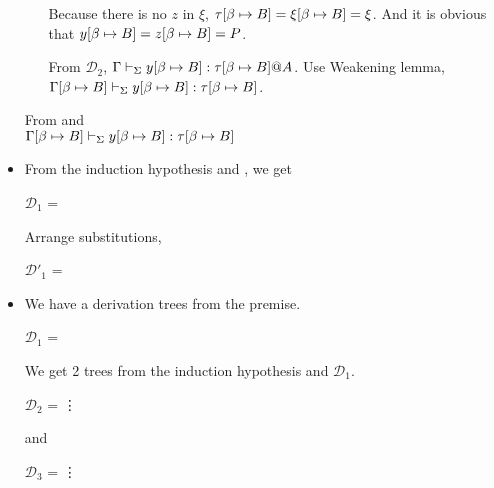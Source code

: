 \begin{itemize}
\begin{itemize}
	      	      	      	      	      	      	      	      
	      	      Because there is no $z$ in $\xi$, $\tau[\beta \mapsto B] = \xi[\beta \mapsto B] = \xi$.
	      	      And it is obvious that $y[\beta \mapsto B] = z[\beta \mapsto B] = P$.
	      	      	      	      	      	      	      	      
	      	      From $\mathcal{D}_2$, $\G \V y\SB : \tau\SB@A$. Use Weakening lemma,  $\Gamma[\beta \mapsto B] \vdash_\Sigma y[\beta \mapsto B] : \tau[\beta \mapsto B]$.
	      \end{itemize}
	      	      	      	      
	      From and \TVar\\
	      $\Gamma[\beta \mapsto B] \vdash_\Sigma y[\beta \mapsto B]:\tau[\beta \mapsto B]$
	      	      	      	      
	      \iffullversion
	      	      	      	      
	\item \TAbs
	      	      	      	      
	      From the induction hypothesis and \TAbs, we get
	      	      	      	      
	      $\mathcal{D}_1$ = 
	      { \andalso {}}
	      	      	      	      
	      Arrange substitutions,
	      	      	      	      
	      $\mathcal{D}'_1$ = 
	      { \andalso {}}
	      	      	      	      
	\item \TApp
	      	      	      	      
	      We have a derivation trees from the premise.
	      	      	      	      
	      $\mathcal{D}_1$ = 
	      {}
	      	      	      	      
	      We get 2 trees from the induction hypothesis and $\mathcal{D}_1$.
	      	      	      	      
	      $\mathcal{D}_2$ = 
	      {\vdots}
	      	      	      	      
	      and
	      	      	      	      
	      $\mathcal{D}_3$ = 
	      {\vdots}
	      	      	      	      

\end{itemize}
